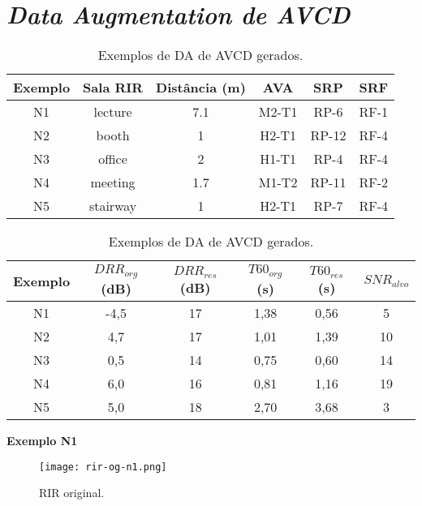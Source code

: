 \pagebreak
\section{\textit{Data Augmentation de AVCD}}

\begin{table} [H]
    \centering
    \caption{Exemplos de DA de AVCD gerados.}
    \label{tbl-a:da-noise}
    \begin{tabular}{c|c|c|c|c|c}

        \textbf{Exemplo} & 
        \textbf{Sala RIR} & 
        \textbf{Distância (m)} &
        \textbf{AVA} &
        \textbf{SRP} &
        \textbf{SRF} \\
        \hline 

        N1 & lecture & 7.1 & M2-T1 & RP-6 & RF-1 \\
        N2 & booth & 1 & H2-T1 & RP-12 & RF-4 \\
        N3 & office & 2 & H1-T1 & RP-4 & RF-4 \\
        N4 & meeting & 1.7 & M1-T2 & RP-11 & RF-2 \\
        N5 & stairway & 1 & H2-T1 & RP-7 & RF-4 \\

    \end{tabular}
    \bigbreak
    \bigbreak
    \begin{tabular}{c|c|c|c|c|c}

        \textbf{Exemplo} & 
        \textbf{$DRR_{org}$ (dB)} & 
        \textbf{$DRR_{res}$ (dB)} & 
        \textbf{$T60_{org}$ (s)} & 
        \textbf{$T60_{res}$ (s)} &
        \textbf{$SNR_{alvo}$} \\
        \hline 

        N1 & -4,5 & 17 & 1,38 & 0,56 & 5 \\
        N2 & 4,7 & 17 & 1,01 & 1,39 & 10 \\
        N3 & 0,5 & 14 & 0,75 & 0,60 & 14 \\
        N4 & 6,0 & 16 & 0,81 & 1,16 & 19 \\
        N5 & 5,0 & 18 & 2,70 & 3,68 & 3 \\

    \end{tabular}
\end{table}

\pagebreak
{\Large \textbf{Exemplo N1}}

\begin{figure} [H]
    \centering
    \texttt{[image: rir-og-n1.png]}
    \caption{RIR original.}
    \label{fig-a:rir-og-n1}
\end{figure} 

